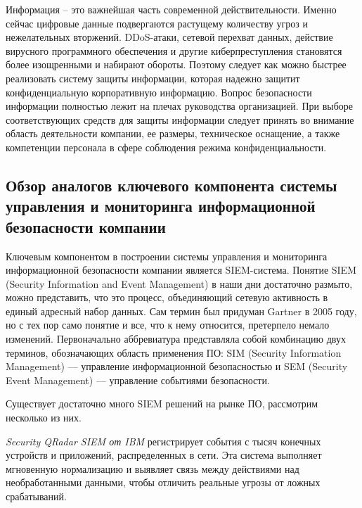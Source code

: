 \begin{enumerate}
Информация – это важнейшая часть современной действительности. Именно сейчас цифровые данные подвергаются растущему количеству угроз и нежелательных вторжений. DDoS-атаки, сетевой перехват данных, действие вирусного программного обеспечения и другие киберпреступления становятся более изощренными и набирают обороты. 
Поэтому следует как можно быстрее реализовать систему защиты информации, которая надежно защитит конфиденциальную корпоративную информацию. Вопрос безопасности информации полностью лежит на плечах руководства организацией. При выборе соответствующих средств для защиты информации следует принять во внимание область деятельности компании, ее размеры, техническое оснащение, а также компетенции персонала в сфере соблюдения режима конфиденциальности.
\end{enumerate}


\subsection{Обзор аналогов ключевого компонента системы управления и мониторинга информационной безопасности компании}
Ключевым компонентом в построении системы управления и мониторинга информационной безопасности компании является SIEM-система.
Понятие SIEM  (Security Information and Event Management) в наши дни достаточно размыто, можно представить, что это процесс, объединяющий сетевую активность в единый адресный набор данных. Сам термин был придуман Gartner в 2005 году, но с тех пор само понятие и все, что к нему относится, претерпело немало изменений. Первоначально аббревиатура представляла собой комбинацию двух терминов, обозначающих область применения ПО: SIM (Security Information Management) — управление информационной безопасностью и SEM (Security Event Management) — управление событиями безопасности.

Существует достаточно много SIEM решений на рынке ПО, рассмотрим несколько из них.

\textit{Security QRadar SIEM от IBM} регистрирует события с тысяч конечных устройств и приложений, распределенных в сети. Эта система выполняет мгновенную нормализацию и выявляет связь между действиями над необработанными данными, чтобы отличить реальные угрозы от ложных срабатываний.

